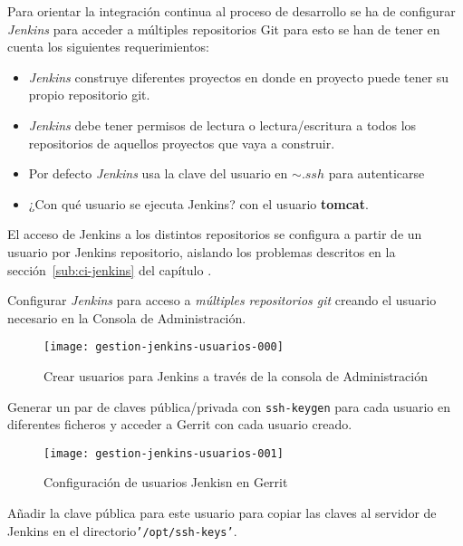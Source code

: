 \par Para orientar la integración continua al proceso de desarrollo se ha de configurar \emph{Jenkins} para acceder a múltiples repositorios Git para esto se han de tener en cuenta los siguientes requerimientos:

\begin{itemize}
    \item \emph{Jenkins} construye diferentes proyectos en donde en proyecto puede tener su propio repositorio git.
    \item \emph{Jenkins} debe tener permisos de lectura o lectura/escritura a todos los repositorios de aquellos proyectos que vaya a construir.
    \item Por defecto \emph{Jenkins} usa la clave del usuario en \texttt{\ensuremath{\sim.ssh}} para autenticarse
    \item ¿Con qué usuario se ejecuta Jenkins? con el usuario \textbf{tomcat}.
\end{itemize}

\par El acceso de Jenkins a los distintos repositorios se configura a partir de un usuario por Jenkins repositorio, aislando los problemas descritos en la sección~\ref{sub:ci-jenkins} del capítulo .

\par Configurar \emph{Jenkins} para acceso a \emph{múltiples repositorios git} creando el usuario necesario en la Consola de Administración.

\begin{figure}[H]
    \centering
    \texttt{[image: gestion-jenkins-usuarios-000]}
    \caption{Crear usuarios para Jenkins a través de la consola de Administración}
    \label{fig:gestion-jenkins-usuarios-000}
\end{figure}

\par Generar un par de claves pública/privada con \texttt{ssh-keygen} para cada usuario en diferentes ficheros y acceder a Gerrit con cada usuario creado.

\begin{figure}[H]
    \centering
    \texttt{[image: gestion-jenkins-usuarios-001]}
    \caption{Configuración de usuarios Jenkisn en Gerrit}
    \label{fig:gestion-jenkins-usuarios-001}
\end{figure}

\par Añadir la clave pública para este usuario para copiar las claves al servidor de Jenkins en el directorio\texttt{'/opt/ssh-keys'}.

